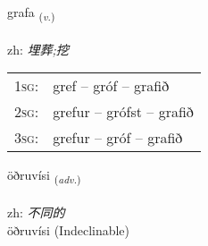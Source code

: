 \documentclass[frontgrid, backgrid]{flacards}\usepackage[]{graphicx}\usepackage[]{color}
\begin{document}
\renewcommand{\flhead}{\vskip5pt \fboxsep=0pt {\small\bfseries\footnotesize Sagnorð | 动词}}
\renewcommand{\fcfoot}{\vskip5pt \fboxsep=0pt \hspace{2pt}{\small\bfseries\footnotesize 2K}}

\renewcommand{\blhead}{\vskip5pt {\small\bfseries\footnotesize Sagnorð | 动词 }}
\renewcommand{\bcfoot}{\vskip5pt \hspace{2pt}{\small\bfseries\footnotesize 2K}}


{grafa \small{\textsubscript{(\textit{v.})}} \\[1ex] %
\textphonetic{[kraːva]} \\
zh: \emph{埋葬;挖} \\  [2ex]
\renewcommand*{\arraystretch}{0.8}
\begin{tabular}{p{1cm}l}
\textsc{1sg}: & gref -- gróf -- grafið \\ 
\textsc{2sg}: & grefur -- grófst -- grafið \\ 
\textsc{3sg}: & grefur -- gróf -- grafið \\ 
\end{tabular}
}


\renewcommand{\flhead}{\vskip5pt \fboxsep=0pt {\small\bfseries\footnotesize Atviksorð | 副词}}
\renewcommand{\fcfoot}{\vskip5pt \fboxsep=0pt \hspace{2pt}{\small\bfseries\footnotesize 2K}}

\renewcommand{\blhead}{\vskip5pt {\small\bfseries\footnotesize Atviksorð | 副词 }}
\renewcommand{\bcfoot}{\vskip5pt \hspace{2pt}{\small\bfseries\footnotesize 2K}}


{öðruvísi \small{\textsubscript{(\textit{adv.})}} \\[1ex]
\textphonetic{[œðrʏvisɪ]} \\
zh: \emph{不同的} \\  [2ex]
öðruvísi (Indeclinable)}

\renewcommand{\flhead}{\vskip5pt \fboxsep=0pt {\small\bfseries\footnotesize Sagnorð | 动词}}
\renewcommand{\fcfoot}{\vskip5pt \fboxsep=0pt \hspace{2pt}{\small\bfseries\footnotesize 2K}}
\end{document}
